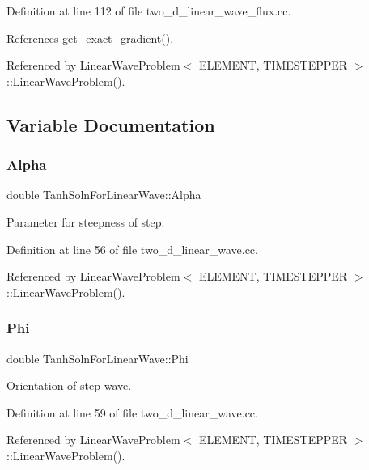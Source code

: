Definition at line 112 of file two\+\_\+d\+\_\+linear\+\_\+wave\+\_\+flux.\+cc.



References get\+\_\+exact\+\_\+gradient().



Referenced by Linear\+Wave\+Problem$<$ E\+L\+E\+M\+E\+N\+T, T\+I\+M\+E\+S\+T\+E\+P\+P\+E\+R $>$\+::\+Linear\+Wave\+Problem().



\subsection{Variable Documentation}
\mbox{\label{namespaceTanhSolnForLinearWave_a48021142056bdea20e6432e360fd0314}} 
\subsubsection{\texorpdfstring{Alpha}{Alpha}}
{\footnotesize\ttfamily double Tanh\+Soln\+For\+Linear\+Wave\+::\+Alpha}



Parameter for steepness of step. 



Definition at line 56 of file two\+\_\+d\+\_\+linear\+\_\+wave.\+cc.



Referenced by Linear\+Wave\+Problem$<$ E\+L\+E\+M\+E\+N\+T, T\+I\+M\+E\+S\+T\+E\+P\+P\+E\+R $>$\+::\+Linear\+Wave\+Problem().

\mbox{\label{namespaceTanhSolnForLinearWave_a5242d421b567b803323bc127081351a6}} 
\subsubsection{\texorpdfstring{Phi}{Phi}}
{\footnotesize\ttfamily double Tanh\+Soln\+For\+Linear\+Wave\+::\+Phi}



Orientation of step wave. 



Definition at line 59 of file two\+\_\+d\+\_\+linear\+\_\+wave.\+cc.



Referenced by Linear\+Wave\+Problem$<$ E\+L\+E\+M\+E\+N\+T, T\+I\+M\+E\+S\+T\+E\+P\+P\+E\+R $>$\+::\+Linear\+Wave\+Problem().


